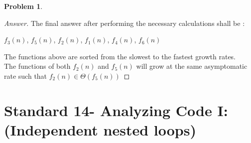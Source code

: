 \documentclass[11pt]{article}
\theoremstyle{definition}
\theoremstyle{definition}
\newtheorem{required}{Problem}
\theoremstyle{definition}
\begin{document}
\begin{required}
\begin{enumerate}[label=(\alph*)]
\begin{proof}[Answer]
The final answer after performing the necessary calculations shall be : \\
\begin{center}
$f_3(n)$, $f_5(n)$, $f_2(n)$, $f_1(n)$, $f_4(n)$, $f_6(n)$
\end{center}
The functions above are sorted from the slowest to the fastest growth rates. \\
The functions of both $f_2(n)$ and $f_5(n)$ will grow at the same asymptomatic rate such that $f_2(n) \in \Theta(f_5(n))$
\end{proof}
\end{enumerate}

\end{required}

\newpage
\section{Standard 14- Analyzing Code I: (Independent nested loops)}
\end{document}
